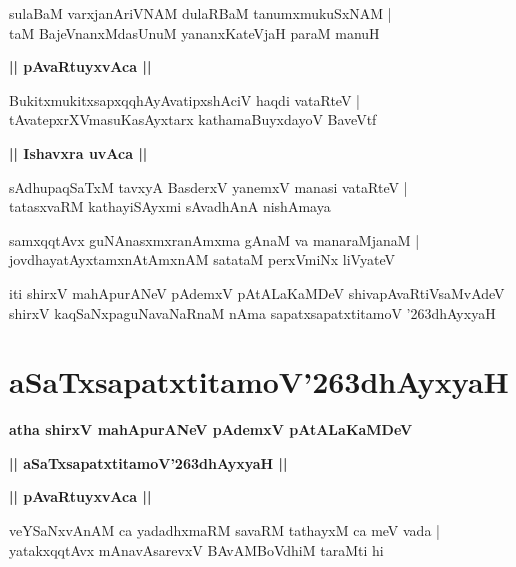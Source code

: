 \documentclass[twoside,12pt,openright]{book}
\def\S{\char'263}
\newcounter{shloka}[chapter]
\def\uvaca#1{\centerline{{\large\textbf{#1}}}}
\begin{document}
\begin{shloka}%
sulaBaM varxjanAriVNAM dulaRBaM tanumxmukuSxNAM |\\
taM BajeVnanxMdasUnuM yananxKateVjaH paraM manuH 
\end{shloka}

\uvaca{|| pAvaRtuyxvAca ||}

\begin{shloka}%
BukitxmukitxsapxqqhAyAvatipxshAciV haqdi vataRteV |\\
tAvatepxrXVmasuKasAyxtarx kathamaBuyxdayoV BaveVtf
\end{shloka}

\uvaca{|| Ishavxra uvAca ||}

\begin{shloka}%
sAdhupaqSaTxM tavxyA BasderxV yanemxV manasi vataRteV |\\
tatasxvaRM kathayiSAyxmi sAvadhAnA nishAmaya 
\end{shloka}

\begin{shloka}%
samxqqtAvx guNAnasxmxranAmxma gAnaM va manaraMjanaM |\\
jovdhayatAyxtamxnAtAmxnAM satataM perxVmiNx liVyateV 
\end{shloka}

\begin{center}
iti shirxV mahApurANeV pAdemxV pAtALaKaMDeV shivapAvaRtiVsaMvAdeV shirxV 
kaqSaNxpaguNavaNaRnaM  nAma sapatxsapatxtitamoV \S dhAyxyaH
\end{center}

\chapter{aSaTxsapatxtitamoV\S dhAyxyaH}

\begin{center}
{\LARGE\bfseries atha shirxV mahApurANeV pAdemxV pAtALaKaMDeV }
\end{center}

\begin{center}         
{\LARGE\bfseries || aSaTxsapatxtitamoV\S dhAyxyaH ||}
\end{center}

\uvaca{|| pAvaRtuyxvAca ||}

\begin{shloka}%
veYSaNxvAnAM ca yadadhxmaRM savaRM tathayxM ca meV vada |\\
yatakxqqtAvx mAnavAsarevxV BAvAMBoVdhiM taraMti hi
\end{shloka}
\end{document}
